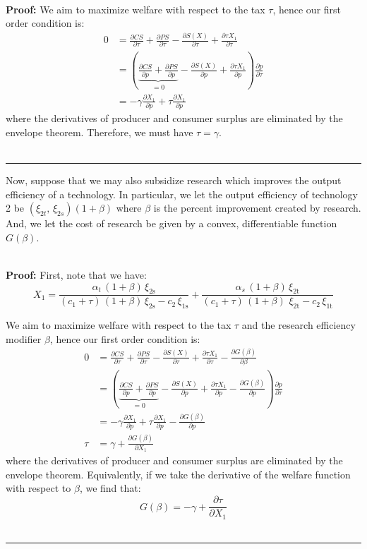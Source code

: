 \documentclass[11pt,a4paper]{extarticle}
\newenvironment{proof}[1][Proof]{\noindent\textbf{#1:} }{\ \rule{0.5em}{0.5em}}
\begin{document}
\hfill \\
\begin{proof} We aim to maximize welfare with respect to the tax $\tau$, hence our first order condition is:
\begin{align*}
0 &= \frac{\partial CS}{\partial \tau} + \frac{\partial PS}{\partial \tau} - \frac{\partial S(X)}{\partial \tau} + \frac{\partial \tau X_1}{\partial \tau} \\
&=  \left( \underbrace{\frac{\partial CS}{\partial p}  + \frac{\partial PS}{\partial p}}_{= 0} - \frac{ \partial  S(X)}{\partial p} + \frac{\partial \tau X_1}{\partial p} \right) \frac{\partial p}{\partial \tau} \\
&=  - \gamma \frac{\partial  X_1}{\partial p} + \tau \frac{\partial  X_1}{\partial p}
\end{align*}
where the derivatives of producer and consumer surplus are eliminated by the envelope theorem. Therefore, we must have $\tau = \gamma$. \\
\hfill
\end{proof}

Now, suppose that we may also subsidize research which improves the output efficiency of a technology. In particular, we let the output efficiency of technology 2 be $(\xi_{2t}, \, \xi_{2s})(1 + \beta)$ where $\beta$ is the percent improvement created by research. And, we let the cost of research be given by a convex, differentiable function $G(\beta)$. 


\hfill \\
\begin{proof} First, note that we have:
$$X_1 = \dfrac{\alpha _{t}\,(1+\beta) \, \xi_{\mathrm{2s}}}{(c_{1}+ \tau)\,(1+\beta)\,\xi _{\mathrm{2s}}-c_{2}\,\xi _{\mathrm{1s}}}+\dfrac{\alpha _{s}\,(1+\beta)\,\xi _{\mathrm{2t}}}{(c_{1}+ \tau)\,(1+\beta)\,\,\xi _{\mathrm{2t}}-c_{2}\,\xi _{\mathrm{1t}}}$$		
	
We aim to maximize welfare with respect to the tax $\tau$ and the research efficiency modifier $\beta$, hence our first order condition is:
\begin{align*}
0 	 &= \frac{\partial CS}{\partial \tau} + \frac{\partial PS}{\partial \tau} - \frac{\partial S(X)}{\partial \tau} + \frac{\partial \tau X_1}{\partial \tau}  - \frac{\partial G(\beta)}{\partial \beta}\\
	 &=  \left( \underbrace{\frac{\partial CS}{\partial p}  + \frac{\partial PS}{\partial p}}_{= 0} - \frac{ \partial  S(X)}{\partial p} + \frac{\partial \tau X_1}{\partial p} - \frac{\partial G(\beta)}{\partial p} \right) \frac{\partial p}{\partial \tau} \\
	 &=  - \gamma \frac{\partial  X_1}{\partial p} + \tau \frac{\partial  X_1}{\partial p} - \frac{\partial G(\beta)}{\partial p} \\
\tau &= \gamma + \frac{\partial G(\beta)}{\partial X_1}
\end{align*}
where the derivatives of producer and consumer surplus are eliminated by the envelope theorem. Equivalently, if we take the derivative of the welfare function with respect to $\beta$, we find that:
$$G(\beta) = -\gamma + \frac{\partial \tau}{\partial X_1}$$
\hfill
\end{proof}
\end{document}

